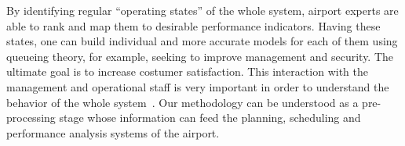 By identifying regular ``operating states'' of the whole system, airport experts are able to rank and map them to  desirable performance indicators. 
Having these states, one can build individual and more accurate models for each of them using queueing theory, for example, seeking to improve management and security. The ultimate goal is to increase costumer satisfaction. 
This interaction with the management and operational staff is very important in order to understand the behavior of the whole system~\cite{chen2015survey}. Our methodology can be understood as a pre-processing stage whose information can feed the planning, scheduling and performance analysis systems of the airport. 

